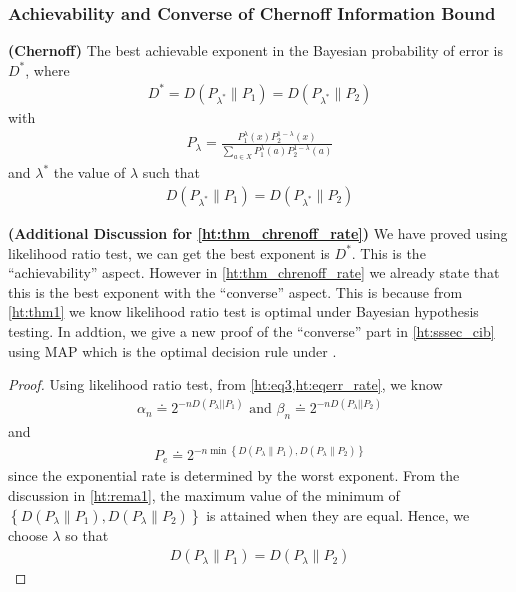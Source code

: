 \documentclass{article}
\newcommand{\bfs}[1]{\textbf{({#1})}}
\begin{document}
\subsubsection{Achievability and Converse of Chernoff Information Bound}
\begin{thma}{\bfs{Chernoff}}\label{ht:thm_chrenoff_rate}
The best achievable exponent in the Bayesian probability of error is $D^{*}$, where
\begin{align*}
D^{*}=D\left(P_{\lambda^{*}} \| P_{1}\right)=D\left(P_{\lambda^{*}} \| P_{2}\right)
\end{align*}
with
\begin{align*}
P_{\lambda}=\frac{P_{1}^{\lambda}(x) P_{2}^{1-\lambda}(x)}{\sum_{a \in X } P_{1}^{\lambda}(a) P_{2}^{1-\lambda}(a)}
\end{align*}
and $\lambda^{*}$ the value of $\lambda$ such that
\begin{align*}
D\left(P_{\lambda^{*}} \| P_{1}\right)=D\left(P_{\lambda^{*}} \| P_{2}\right)
\end{align*}
\end{thma} 
\begin{rema}{\bfs{Additional Discussion for \cref{ht:thm_chrenoff_rate}}}
We have proved using likelihood ratio test, we can get the best exponent is $D^{*}$. This is the ``achievability'' aspect. However in \cref{ht:thm_chrenoff_rate} we already state that this is the best exponent with the ``converse'' aspect. This is because from \cref{ht:thm1} we know likelihood ratio test is optimal under Bayesian hypothesis testing. In addtion, we give a new proof of the  ``converse'' part in \cref{ht:sssec_cib} using MAP which is the optimal decision rule under .
\end{rema}
\begin{proof}
Using likelihood ratio test, from \cref{ht:eq3,ht:eqerr_rate}, we know \begin{align}
\alpha_{n} \doteq 2^{-n D\left(P_{\lambda}|| P_{1}\right)} \text{ and } \beta_{n} \doteq 2^{-n D\left(P_{\lambda}|| P_{2}\right)} 
\end{align}
and 
\begin{align*}
P_{e} \doteq 2^{-n \min \left\{D\left(P_{\lambda} \| P_{1}\right), D\left(P_{\lambda} \| P_{2}\right)\right\}}
\end{align*}
since the exponential rate is determined by the worst exponent. From the discussion in \cref{ht:rema1}, the maximum value of the minimum of $\left\{D\left(P_{\lambda} \| P_{1}\right), D\left(P_{\lambda} \| P_{2}\right)\right\}$ is attained when they are equal.  Hence, we choose $\lambda$ so that
\begin{align*}
D\left(P_{\lambda} \| P_{1}\right)=D\left(P_{\lambda} \| P_{2}\right)
\end{align*}
\end{proof}
\end{document}
